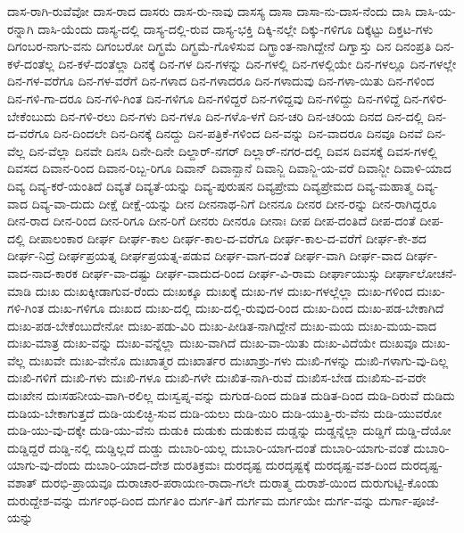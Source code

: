 {ದಾಸ-ರಾಗಿ-ರುವೆವೋ
ದಾಸ-ರಾದ
ದಾಸರು
ದಾಸ-ರು-ನಾವು
ದಾಸಸ್ಯ
ದಾಸಾ
ದಾಸಾ-ನು-ದಾಸ-ನೆಂದು
ದಾಸಿ
ದಾಸಿ-ಯ-ರನ್ನಾಗಿ
ದಾಸಿ-ಯೆಂದು
ದಾಸ್ಯ-ದಲ್ಲಿ
ದಾಸ್ಯ-ದಲ್ಲಿ-ರುವ
ದಾಸ್ಯ-ಭಕ್ತಿ
ದಿಕ್ಕಿ-ನಲ್ಲೇ
ದಿಕ್ಕು-ಗಳಿಗೂ
ದಿಕ್ಕೆಟ್ಟು
ದಿಕ್ತಟ-ಗಳು
ದಿಗಂಬರ-ನಾಗು-ವನು
ದಿಗಂಬರೋ
ದಿಗ್ಭ್ರಮೆ
ದಿಗ್ಭ್ರಮೆ-ಗೊಳಿಸುವ
ದಿಗ್ಭ್ರಾಂತ-ನಾಗಿದ್ದೇನೆ
ದಿಗ್ವಾಸ್ತು
ದಿನ
ದಿನಂಪ್ರತಿ
ದಿನ-ಕಳೆ-ದಂತೆಲ್ಲ
ದಿನ-ಕಳೆ-ದಂತೆಲ್ಲಾ
ದಿನಕ್ಕೆ
ದಿನ-ಗಳ
ದಿನ-ಗಳನ್ನು
ದಿನ-ಗಳಲ್ಲಿ
ದಿನ-ಗಳಲ್ಲಿಯೇ
ದಿನ-ಗಳಲ್ಲೂ
ದಿನ-ಗಳಲ್ಲೇ
ದಿನ-ಗಳ-ವರೆಗೂ
ದಿನ-ಗಳ-ವರೆಗೆ
ದಿನ-ಗಳಾದ
ದಿನ-ಗಳಾದರೂ
ದಿನ-ಗಳಾದುವು
ದಿನ-ಗಳಾ-ಯಿತು
ದಿನ-ಗಳಿಂದ
ದಿನ-ಗಳಿ-ಗಾ-ದರೂ
ದಿನ-ಗಳಿ-ಗಿಂತ
ದಿನ-ಗಳಿಗೂ
ದಿನ-ಗಳಿದ್ದರೆ
ದಿನ-ಗಳಿದ್ದವು
ದಿನ-ಗಳಿದ್ದು
ದಿನ-ಗಳಿದ್ದೆ
ದಿನ-ಗಳಿರ-ಬೇಕೆಂಬುದು
ದಿನ-ಗಳಿ-ರಲು
ದಿನ-ಗಳು
ದಿನ-ಗಳೂ
ದಿನ-ಗಳೊ-ಳಗೆ
ದಿನ-ಚರಿ
ದಿನ-ಚರಿಯ
ದಿನದ
ದಿನ-ದಲ್ಲಿ
ದಿನ-ದ-ವರೆಗೂ
ದಿನ-ದಿಂದಲೇ
ದಿನ-ದಿನಕ್ಕೆ
ದಿನದ್ದು
ದಿನ-ಪತ್ರಿಕೆ-ಗಳಿಂದ
ದಿನ-ವನ್ನು
ದಿನ-ವಾದರೂ
ದಿನವೂ
ದಿನವೆ
ದಿನ-ವೆಲ್ಲ
ದಿನ-ವೆಲ್ಲಾ
ದಿನವೇ
ದಿನಸಿ
ದಿನೇ-ದಿನೇ
ದಿಲ್ದಾರ್-ನಗರ್
ದಿಲ್ಲಾರ್-ನಗರ-ದಲ್ಲಿ
ದಿವಸ
ದಿವಸಕ್ಕೆ
ದಿವಸ-ಗಳಲ್ಲಿ
ದಿವಸದ
ದಿವಾನ-ರಿಂದ
ದಿವಾನ-ರಿಬ್ಬ-ರಿಗೂ
ದಿವಾನ್
ದಿವಾನ್ಖಾನೆ
ದಿವಾನ್ಜಿ
ದಿವಾನ್ಜಿ-ಯ-ವರೆ
ದಿವಾನ್ಜೀ
ದಿವಾಳಿ-ಯಾದ
ದಿವ್ಯ
ದಿವ್ಯ-ಕರೆ-ಯಂತಿದೆ
ದಿವ್ಯತೆ
ದಿವ್ಯತೆ-ಯನ್ನು
ದಿವ್ಯ-ಪುರುಷನ
ದಿವ್ಯಪ್ರೇಮ
ದಿವ್ಯಪ್ರೇಮದ
ದಿವ್ಯ-ಮಹಾತ್ಮ
ದಿವ್ಯ-ವಾದ
ದಿವ್ಯ-ವಾ-ದುದು
ದೀಕ್ಷೆ
ದೀಕ್ಷೆ-ಯನ್ನು
ದೀನ
ದೀನನಾಥ-ನಿಗೆ
ದೀನನೂ
ದೀನರ
ದೀನ-ರನ್ನು
ದೀನ-ರಾಗಿದ್ದರೂ
ದೀನ-ರಾದ
ದೀನ-ರಿಂದ
ದೀನ-ರಿಗೂ
ದೀನ-ರಿಗೆ
ದೀನರು
ದೀನರೂ
ದೀನಾಃ
ದೀಪ
ದೀಪ-ದಂತಿದೆ
ದೀಪ-ದಂತೆ
ದೀಪ-ದಲ್ಲಿ
ದೀಪಾಲಂಕಾರ
ದೀರ್ಘ
ದೀರ್ಘ-ಕಾಲ
ದೀರ್ಘ-ಕಾಲ-ದ-ವರೆಗೂ
ದೀರ್ಘ-ಕಾಲ-ದ-ವರೆಗೆ
ದೀರ್ಘ-ಕೇ-ಶದ
ದೀರ್ಘ-ನಿದ್ರೆ
ದೀರ್ಘಪ್ರಯತ್ನ
ದೀರ್ಘಪ್ರಯತ್ನ-ಪಡುವ
ದೀರ್ಘ-ವಾಗ-ದಂತೆ
ದೀರ್ಘ-ವಾಗಿ
ದೀರ್ಘ-ವಾದ
ದೀರ್ಘ-ವಾದ-ನಾದ-ಕಾರಕ
ದೀರ್ಘ-ವಾ-ದಷ್ಟು
ದೀರ್ಘ-ವಾದುದ-ರಿಂದ
ದೀರ್ಘ-ವಿ-ರಾಮ
ದೀರ್ಘಾಯುಸ್ಸು
ದೀರ್ಘಾಲೋಚನೆ-ಮಾಡಿ
ದುಃಖ
ದುಃಖಕ್ಕೀಡಾಗುವ-ರೆಂದು
ದುಃಖಕ್ಕೂ
ದುಃಖಕ್ಕೆ
ದುಃಖ-ಗಳ
ದುಃಖ-ಗಳಲ್ಲೆಲ್ಲಾ
ದುಃಖ-ಗಳಿಂದ
ದುಃಖ-ಗಳಿ-ಗಿಂತ
ದುಃಖ-ಗಳಿಗೂ
ದುಃಖದ
ದುಃಖ-ದಲ್ಲಿ
ದುಃಖ-ದಲ್ಲಿ-ರುವುದ-ರಿಂದ
ದುಃಖ-ದಿಂದ
ದುಃಖ-ಪಡ-ಬೇಕಾಗಿದೆ
ದುಃಖ-ಪಡ-ಬೇಕೆಂಬುದೇನೋ
ದುಃಖ-ಪಡು-ವಿರಿ
ದುಃಖ-ಪೀಡಿತ-ನಾಗಿದ್ದೇನೆ
ದುಃಖ-ಮಯ
ದುಃಖ-ಮಯ-ವಾದ
ದುಃಖ-ಮಾತ್ರ
ದುಃಖ-ವನ್ನು
ದುಃಖ-ವನ್ನೆಲ್ಲಾ
ದುಃಖ-ವಾಗಿದೆ
ದುಃಖ-ವಾ-ಯಿತು
ದುಃಖ-ವಿದೆಯೇ
ದುಃಖವೂ
ದುಃಖ-ವೆಲ್ಲ
ದುಃಖವೇ
ದುಃಖ-ವೇನೊ
ದುಃಖಾತ್ಮರ
ದುಃಖಾರ್ತರ
ದುಃಖಾಶ್ರು-ಗಳು
ದುಃಖಿ-ಗಳನ್ನು
ದುಃಖಿ-ಗಳಾಗು-ವು-ದಿಲ್ಲ
ದುಃಖಿ-ಗಳಿಗೆ
ದುಃಖಿ-ಗಳು
ದುಃಖಿ-ಗಳೂ
ದುಃಖಿ-ಗಳೇ
ದುಃಖಿತ-ನಾಗಿ-ರುವೆ
ದುಃಖಿಸ-ಬೇಡ
ದುಃಖಿಸು-ವ-ವರೇ
ದುಃಖೇನ
ದುಃಸಹನೀಯ-ವಾಗಿ-ರಲಿಲ್ಲ
ದುಃಸ್ವಪ್ನ-ವನ್ನು
ದುಗುಡ-ದಿಂದ
ದುಡಿತ
ದುಡಿತ-ದಿಂದ
ದುಡಿ-ದಿರುವೆ
ದುಡಿದು
ದುಡಿಯ-ಬೇಕಾಗುತ್ತದೆ
ದುಡಿ-ಯಲಿಚ್ಛಿ-ಸುವ
ದುಡಿ-ಯಲು
ದುಡಿ-ಯಿರಿ
ದುಡಿ-ಯುತ್ತಿ-ರು-ವೆನು
ದುಡಿ-ಯುವರೋ
ದುಡಿ-ಯು-ವು-ದಕ್ಕೇ
ದುಡಿ-ಯು-ವೆನು
ದುಡುಕಿ
ದುಡುಕು
ದುಡುಕುವ
ದುಡ್ಡನ್ನು
ದುಡ್ಡನ್ನೆಲ್ಲಾ
ದುಡ್ಡಿಗೆ
ದುಡ್ಡಿ-ದೆಯೋ
ದುಡ್ಡಿದ್ದರೆ
ದುಡ್ಡಿ-ನಲ್ಲಿ
ದುಡ್ಡಿಲ್ಲದೆ
ದುಡ್ಡು
ದುಬಾರಿ-ಯಲ್ಲ
ದುಬಾರಿ-ಯಾಗ-ದಂತೆ
ದುಬಾರಿ-ಯಾಗು-ವಂತೆ
ದುಬಾರಿ-ಯಾಗು-ವು-ದೆಂದು
ದುಬಾರಿ-ಯಾದ-ದೇಶ
ದುರತಿಕ್ರಮಃ
ದುರದೃಷ್ಟ
ದುರದೃಷ್ಟಕ್ಕೆ
ದುರದೃಷ್ಟ-ವಶ-ದಿಂದ
ದುರದೃಷ್ಟ-ವಶಾತ್
ದುರಭಿ-ಪ್ರಾಯವೂ
ದುರಾಚಾರ-ಪರಾಯಣ-ರಾದಾ-ಗಲೇ
ದುರಾತ್ಮ
ದುರಾಶೆ-ಯಿಂದ
ದುರುಗುಟ್ಟಿ-ಕೊಂಡು
ದುರುದ್ದೇಶ-ವನ್ನು
ದುರ್ಗಂಧ-ದಿಂದ
ದುರ್ಗತಿಂ
ದುರ್ಗ-ತಿಗೆ
ದುರ್ಗಮ
ದುರ್ಗಯೇ
ದುರ್ಗ-ವನ್ನು
ದುರ್ಗಾ-ಪೂಜೆ-ಯನ್ನು
}
